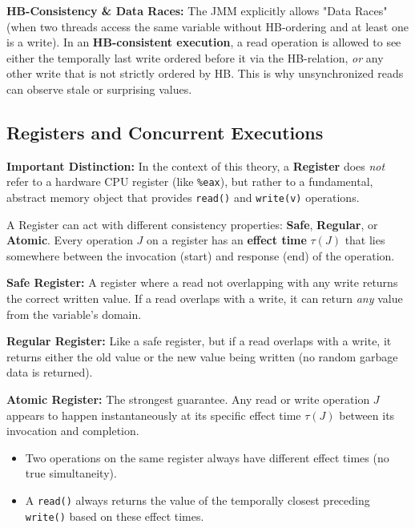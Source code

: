 \begin{remark}
    \textbf{HB-Consistency \& Data Races:} The JMM explicitly allows "Data Races" (when two threads access the same variable without HB-ordering and at least one is a write). In an \textbf{HB-consistent execution}, a read operation is allowed to see either the temporally last write ordered before it via the HB-relation, \textit{or} any other write that is not strictly ordered by HB. This is why unsynchronized reads can observe stale or surprising values.
\end{remark}

\subsection{Registers and Concurrent Executions}

\begin{important}
    \textbf{Important Distinction:} In the context of this theory, a \textbf{Register} does \textit{not} refer to a hardware CPU register (like \texttt{\%eax}), but rather to a fundamental, abstract memory object that provides \texttt{read()} and \texttt{write(v)} operations.
\end{important}

\begin{definition}
    A Register can act with different consistency properties: \textbf{Safe}, \textbf{Regular}, or \textbf{Atomic}. Every operation $J$ on a register has an \textbf{effect time} $\tau(J)$ that lies somewhere between the invocation (start) and response (end) of the operation.
\end{definition}

\begin{theorem}
    \textbf{Safe Register:} A register where a read not overlapping with any write returns the correct written value. If a read overlaps with a write, it can return \textit{any} value from the variable's domain.
\end{theorem}

\begin{theorem}
    \textbf{Regular Register:} Like a safe register, but if a read overlaps with a write, it returns either the old value or the new value being written (no random garbage data is returned).
\end{theorem}

\begin{theorem}
    \textbf{Atomic Register:} The strongest guarantee. Any read or write operation $J$ appears to happen instantaneously at its specific effect time $\tau(J)$ between its invocation and completion. 
    \begin{itemize}
        \item Two operations on the same register always have different effect times (no true simultaneity).
        \item A \texttt{read()} always returns the value of the temporally closest preceding \texttt{write()} based on these effect times.
    \end{itemize}
\end{theorem}

